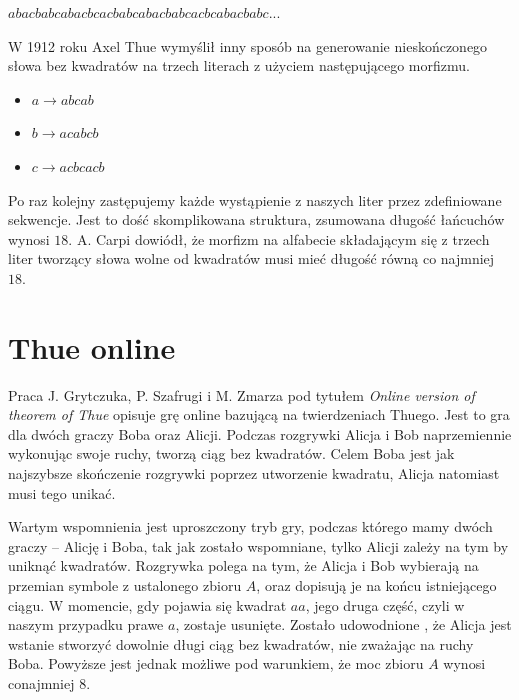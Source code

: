 \documentclass[document]{xmgr}
\begin{document}
{\centering $abacbabcabacbcacbabcabacbabcacbcabacbabc...$ \par}

W 1912 roku Axel Thue wymyślił inny sposób na generowanie nieskończonego słowa bez kwadratów na trzech literach z użyciem następującego morfizmu. 
\begin{itemize}
\item $a \to abcab$
\item $b \to acabcb$
\item $c \to acbcacb$
\end{itemize}


Po raz kolejny zastępujemy każde wystąpienie z naszych liter przez zdefiniowane sekwencje. Jest to dość skomplikowana struktura, zsumowana długość łańcuchów wynosi $18$. A. Carpi \cite{carpi} dowiódł, że morfizm na alfabecie składającym się z trzech liter tworzący słowa wolne od kwadratów musi mieć długość równą co najmniej $18$.

\section{Thue online}
Praca J. Grytczuka, P. Szafrugi i M. Zmarza pod tytułem \textit{Online version of theorem of Thue} \cite{thueonline} opisuje grę online bazującą na twierdzeniach Thuego. Jest to gra dla dwóch graczy Boba oraz Alicji. Podczas rozgrywki Alicja i Bob naprzemiennie wykonując swoje ruchy, tworzą ciąg bez kwadratów. Celem Boba jest jak najszybsze skończenie rozgrywki poprzez utworzenie kwadratu, Alicja natomiast musi tego unikać.

Wartym wspomnienia jest uproszczony tryb gry, podczas którego mamy dwóch graczy -- Alicję i Boba, tak jak zostało wspomniane, tylko Alicji zależy na tym by uniknąć kwadratów. Rozgrywka polega na tym, że Alicja i Bob wybierają na przemian symbole z ustalonego zbioru $A$, oraz dopisują je na końcu istniejącego ciągu. W momencie, gdy pojawia się kwadrat $aa$, jego druga część, czyli w naszym przypadku prawe $a$, zostaje usunięte. Zostało udowodnione \cite{thueonline2}, że Alicja jest wstanie stworzyć dowolnie długi ciąg bez kwadratów, nie zważając na ruchy Boba. Powyższe jest jednak możliwe pod warunkiem, że moc zbioru $A$ wynosi conajmniej 8.
\end{document}

